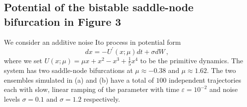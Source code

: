 \documentclass[../main.tex]{subfiles}
\begin{document}
\subsection{Potential of the bistable saddle-node bifurcation in Figure 3}\label{S2}
We consider an additive noise Ito process in potential form
\begin{equation*}
     dx = -U^{'}(x;\mu)dt + \sigma dW\,,
\end{equation*}
where we set $U(x;\mu)=\mu x + x^2 - x^3 + \frac{1}{5}x^4$ to be the primitive dynamics. The system has two saddle-node bifurcations at $\mu\approx-0.38$ and $\mu\approx1.62$. The two ensembles simulated in (a) and (b) have a total of $100$ independent trajectories each with slow, linear ramping of the parameter with time $\varepsilon=10^{-2}$ and noise levels $\sigma = 0.1$ and $\sigma = 1.2$ respectively.
\end{document}
